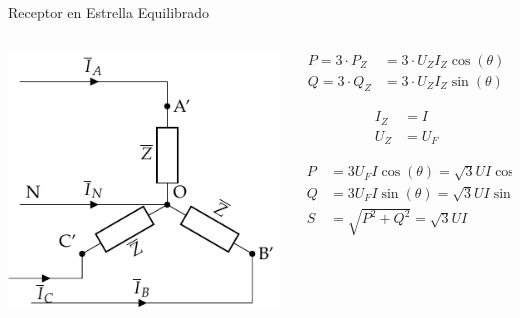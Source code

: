 \documentclass[aspectratio=169, usenames,svgnames,dvipsnames]{beamer}
\begin{document}
\begin{frame}[label={sec:org2931b92}]{Receptor en Estrella Equilibrado}
\begin{columns}
\begin{column}{0.5\columnwidth}
\begin{center}
\includegraphics[width=.9\linewidth]{../figs/EstrellaEquilibrado_Receptor.pdf}
\end{center}
\end{column}

\begin{column}{0.5\columnwidth}
\begin{align*}
  P = 3 \cdot P_Z &= 3 \cdot U_Z I_Z \cos(\theta)\\
  Q = 3 \cdot Q_Z &= 3 \cdot U_Z I_Z \sin(\theta)
\end{align*}

\begin{align*}
  I_Z &= I\\
  U_Z &= U_F
\end{align*}


\begin{align*}
  P &= 3 U_F I \cos(\theta) = \sqrt{3} U I \cos(\theta)\\
  Q &= 3 U_F I \sin(\theta) = \sqrt{3} U I \sin(\theta)\\
  S &= \sqrt{P^2 + Q^2} =  \sqrt{3} U I
\end{align*}
\end{column}
\end{columns}
\end{frame}
\end{document}
